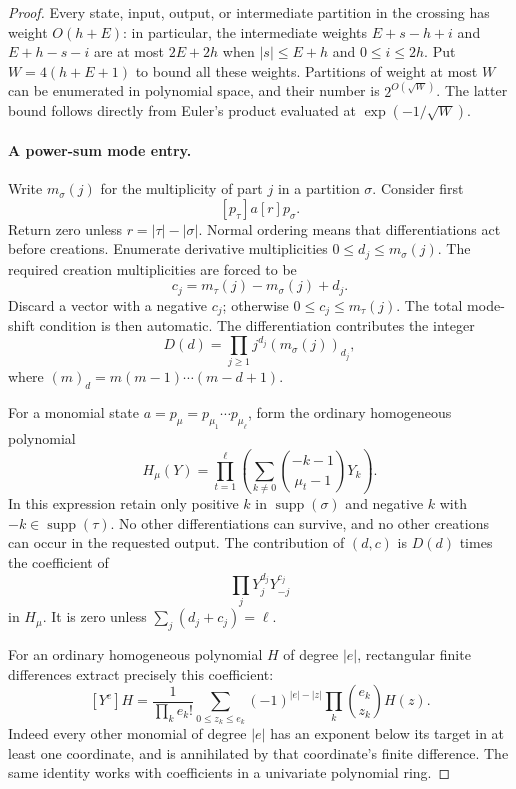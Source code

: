 \begin{proof}
Every state, input, output, or intermediate partition in the
crossing has weight $O(h+E)$: in particular, the intermediate
weights $E+s-h+i$ and $E+h-s-i$ are at most $2E+2h$ when
$|s|\le E+h$ and $0\le i\le2h$.  Put $W=4(h+E+1)$ to bound
all these weights.  Partitions of weight at most $W$ can be
enumerated in polynomial space, and their number is
$2^{O(\sqrt W)}$.  The latter bound follows directly from Euler's
product evaluated at $\exp(-1/\sqrt W)$.

\paragraph{A power-sum mode entry.}
Write $m_\sigma(j)$ for the multiplicity of part $j$ in a
partition $\sigma$.  Consider first
\[
 [p_\tau]a[r]p_\sigma.
\]
Return zero unless $r=|\tau|-|\sigma|$.  Normal ordering means
that differentiations act before creations.  Enumerate derivative
multiplicities $0\le d_j\le m_\sigma(j)$.  The required creation
multiplicities are forced to be
\[
 c_j=m_\tau(j)-m_\sigma(j)+d_j.
\]
Discard a vector with a negative $c_j$; otherwise
$0\le c_j\le m_\tau(j)$.  The total mode-shift condition is then
automatic.  The differentiation contributes the integer
\[
 D(d)=\prod_{j\ge1}j^{d_j}(m_\sigma(j))_{d_j},
\]
where $(m)_d=m(m-1)\cdots(m-d+1)$.

For a monomial state $a=p_\mu=p_{\mu_1}\cdots p_{\mu_\ell}$,
form the ordinary homogeneous polynomial
\[
 H_\mu(Y)=\prod_{t=1}^{\ell}
       \left(\sum_{k\ne0}\binom{-k-1}{\mu_t-1}Y_k\right).
\]
In this expression retain only positive $k$ in
$\operatorname{supp}(\sigma)$ and negative $k$ with
$-k\in\operatorname{supp}(\tau)$.  No other differentiations can
survive, and no other creations can occur in the requested output.
The contribution of $(d,c)$ is $D(d)$ times the coefficient of
\[
 \prod_jY_j^{d_j}Y_{-j}^{c_j}
\]
in $H_\mu$.  It is zero unless $\sum_j(d_j+c_j)=\ell$.

For an ordinary homogeneous polynomial $H$ of degree $|e|$,
rectangular finite differences extract precisely this coefficient:
\begin{equation}
\label{eq:algebraic-rectangular-differences}
 [Y^e]H
 =\frac1{\prod_k e_k!}
   \sum_{0\le z_k\le e_k}
       (-1)^{|e|-|z|}\prod_k\binom{e_k}{z_k}H(z).
\end{equation}
Indeed every other monomial of degree $|e|$ has an exponent below
its target in at least one coordinate, and is annihilated by that
coordinate's finite difference.  The same identity works with
coefficients in a univariate polynomial ring.


\end{proof}
